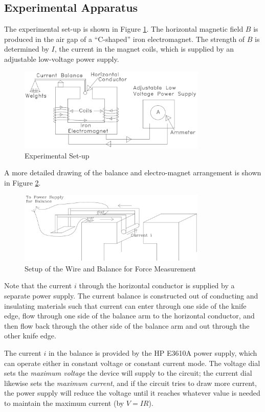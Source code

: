 \subsection{Experimental Apparatus}
The experimental set-up is shown in Figure {\ref{fig:set-up}}. The horizontal magnetic field $B$ is produced in the air gap of a ``C-shaped'' iron electromagnet. The strength of $B$ is determined by $I$, the current in the magnet coils, which is supplied by an adjustable low-voltage power supply.\myskip
\begin{figure}[h]
\centering
\includegraphics[width=0.8\textwidth]{./Exp5/pic/image2.png}
\caption{Experimental Set-up}
\label{fig:set-up}
\end{figure} 

A more detailed drawing of the balance and electro-magnet arrangement is shown in Figure {\ref{fig:measureforce}}.
\begin{figure}[h]
\centering
\includegraphics[width=0.8\textwidth]{./Exp5/pic/image3.png}
\caption{Setup of the Wire and Balance for Force Measurement}
\label{fig:measureforce}
\end{figure} 

Note that the current $i$ through the horizontal conductor is supplied by a separate power supply. The current balance is constructed out of conducting and insulating materials such that current can enter through one side of the knife edge, flow through one side of the balance arm to the horizontal conductor, and then flow back through the other side of the balance arm and out through the other knife edge. \myskip

The current $i$ in the balance is provided by the HP E3610A power supply, which can operate either in constant voltage or constant current mode. The voltage dial sets the \emph{maximum voltage} the device will supply to the circuit; the current dial likewise sets the \emph{maximum current}, and if the circuit tries to draw more current, the power supply will reduce the voltage until it reaches whatever value is needed to maintain the maximum current (by $V = IR$). \myskip 

